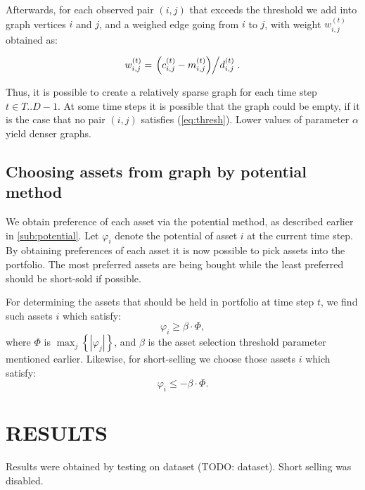 \documentclass[letterpaper, 10 pt, conference]{ieeeconf}
\begin{document}
  Afterwards, for each observed pair $(i,j)$ that exceeds the threshold we add into graph vertices $i$ and $j$, and a weighed edge going from $i$ to $j$, with weight $w_{i,j}^{(t)}$ obtained as:
  
  \begin{equation}
    \label{eq:weight}
    w_{i,j}^{(t)} = \left. \left(c_{i,j}^{(t)} - m_{i,j}^{(t)}\right) \middle/ d_{i,j}^{(t)} \right..
  \end{equation}
  
  Thus, it is possible to create a relatively sparse graph for each time step $t \in T..D-1$.
  At some time steps it is possible that the graph could be empty, if it is the case that no pair $(i,j)$ satisfies (\ref{eq:thresh}).
  Lower values of parameter $\alpha$ yield denser graphs.
  
  \subsection{Choosing assets from graph by potential method}
  We obtain preference of each asset via the potential method, as described earlier in \ref{sub:potential}.
  Let $\varphi_i$ denote the potential of asset $i$ at the current time step.
  By obtaining preferences of each asset it is now possible to pick assets into the portfolio.
  The most preferred assets are being bought while the least preferred should be short-sold if possible.
  
  For determining the assets that should be held in portfolio at time step $t$, we find such assets $i$ which satisfy:
  \begin{equation}
    \varphi_i \ge \beta \cdot \Phi,
  \end{equation}
  where $\Phi$ is $\max_j \left\{ \left|\varphi_j\right| \right\}$, and $\beta$ is the asset selection threshold parameter mentioned earlier.
  Likewise, for short-selling we choose those assets $i$ which satisfy:
  \begin{equation}
  \varphi_i \le -\beta \cdot \Phi.
  \end{equation}
  
  \section{RESULTS}
  
  Results were obtained by testing on dataset (TODO: dataset).
  Short selling was disabled.
  
\end{document}
